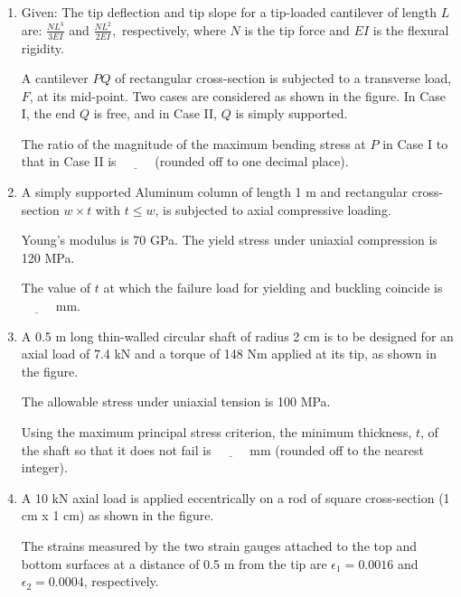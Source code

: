 \documentclass[journal,9pt,onecolumn]{IEEEtran}
\begin{document}
\begin{enumerate}
\item Given: The tip deflection and tip slope for a tip-loaded cantilever of length $L$ are: $\frac{NL^3}{3EI} $ and $\frac{NL^2}{2EI},$
    respectively, where $N$ is the tip force and $EI$ is the flexural rigidity.

    A cantilever $PQ$ of rectangular cross-section is subjected to a transverse load, $F$, at its mid-point. Two cases are considered as shown in the figure. In Case I, the end $Q$ is free, and in Case II, $Q$ is simply supported.

    The ratio of the magnitude of the maximum bending stress at $P$ in Case I to that in Case II is $\underline{\hspace{1cm}}$  (rounded off to one decimal place).  
\begin{multicols}{2}
    
    
\end{multicols}

\item A simply supported Aluminum column of length 1 m and rectangular cross-section $w \times t$ with $t \leq w$, is subjected to axial compressive loading.

    Young's modulus is 70 GPa. The yield stress under uniaxial compression is 120 MPa.

    The value of $t$ at which the failure load for yielding and buckling coincide is $\underline{\hspace{1cm}}$ mm.

\item A 0.5 m long thin-walled circular shaft of radius 2 cm is to be designed for an axial load of 7.4 kN and a torque of 148 Nm applied at its tip, as shown in the figure.

The allowable stress under uniaxial tension is 100 MPa.

Using the maximum principal stress criterion, the minimum thickness, $t$, of the shaft so that it does not fail is $\underline{\hspace{1cm}}$ mm (rounded off to the nearest integer).  
\begin{center}
    
\end{center}
\item A 10 kN axial load is applied eccentrically on a rod of square cross-section (1 cm x 1 cm) as shown in the figure.

The strains measured by the two strain gauges attached to the top and bottom surfaces at a distance of 0.5 m from the tip are $\epsilon_1 = 0.0016$ and $\epsilon_2 = 0.0004$, respectively.  


\end{enumerate}
\end{document}
